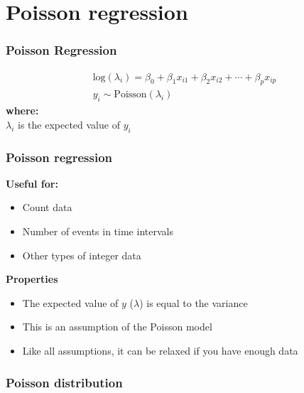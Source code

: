 \documentclass[color=usenames,dvipsnames]{beamer}\usepackage[]{graphicx}\usepackage[]{color}
\begin{document}
\section{Poisson regression}



\begin{frame}
  \frametitle{Poisson Regression}
  \Large
    \begin{gather*}
      \mathrm{log}(\lambda_i) = \beta_0 + \beta_1 x_{i1} + \beta_2 x_{i2} + \cdots + \beta_p x_{ip} \\
      y_i \sim \mathrm{Poisson}(\lambda_i)
  \end{gather*}
  \pause
  {\bf where: \\}
  $\lambda_i$ is the expected value of $y_i$ \\
\end{frame}



\begin{frame}
  \frametitle{Poisson regression}
  \large
  {\bf Useful for:}
  \begin{itemize}
    \item Count data
    \item Number of events in time intervals
    \item Other types of integer data
  \end{itemize}
  \pause
  \vfill
  {\bf Properties}
  \begin{itemize}
    \item The expected value of $y$ ($\lambda$) is equal to the variance
    \item This is an assumption of the Poisson model
    \item Like all assumptions, it can be relaxed if you have enough data
  \end{itemize}
\end{frame}




\begin{frame}[fragile]
  \frametitle{Poisson distribution}



\begin{center}
\end{center}
\end{frame}
\end{document}
